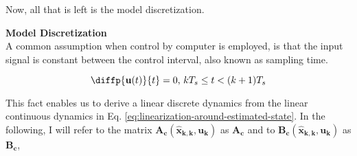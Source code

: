 \documentclass[12pt]{article}
\begin{document}
Now, all that is left is the model discretization.

\noindent\textbf{Model Discretization}\\
A common assumption when control by computer is employed, is that the input signal is constant between the control interval, also known as sampling time. 

\begin{equation}
    \diffp{\mathbf{u}(t)}{t} = 0 \text{, } kT_s \leq t < (k+1)T_s
\end{equation}

This fact enables us to derive a linear discrete dynamics from the linear continuous dynamics in Eq. \ref{eq:linearization-around-estimated-state}. In the following, I will refer to the matrix $\mathbf{A_c}(\mathbf{\hat{x}_{k,k}}, \mathbf{u_k})$ as $\mathbf{A_c}$ and to $\mathbf{B_c}(\mathbf{\hat{x}_{k,k}}, \mathbf{u_k})$ as $\mathbf{B_c}$,
\end{document}
